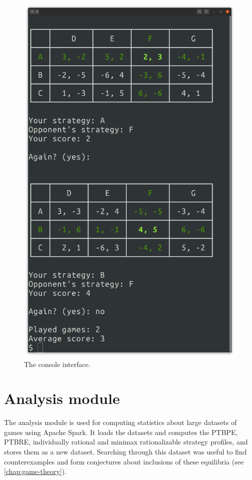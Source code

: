 \begin{figure}
	\centering
	\includegraphics[width=12cm]{fig/console.png}
	\caption{The console interface.}
	\label{fig:console-screen}
\end{figure}

\section{Analysis module}
The analysis module is used for computing statistics about large datasets of games using Apache Spark.
It loads the datasets and computes the PTBPE, PTBRE, individually rational and minimax rationalizable strategy profiles, and stores them as a new dataset.
Searching through this dataset was useful to find counterexamples and form conjectures about inclusions of these equilibria (see \autoref{chap:game-theory}).
